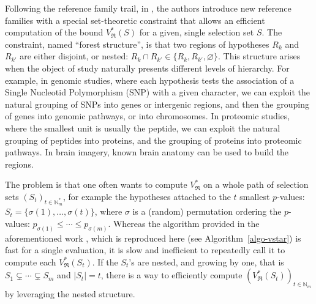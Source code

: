\documentclass[
  11pt,
  a4paper,
]{article}
\theoremstyle{plain}
\theoremstyle{definition}
\theoremstyle{plain}
\theoremstyle{definition}
\theoremstyle{plain}
\theoremstyle{remark}
\begin{document}
Following the reference family trail, in \citet{MR4178188}, the authors
introduce new reference families with a special set-theoretic constraint
that allows an efficient computation of the bound
\(V^*_{\mathfrak{R}}(S)\) for a given, single selection set \(S\). The
constraint, named ``forest structure'', is that two regions of
hypotheses \(R_k\) and \(R_{k'}\) are either disjoint, or nested:
\(R_k\cap R_{k'}\in\{R_k,R_{k'},\varnothing\}\). This structure arises
when the object of study naturally presents different levels of
hierarchy. For example, in genomic studies, where each hypothesis tests
the association of a Single Nucleotid Polymorphism (SNP) with a given
character, we can exploit the natural grouping of SNPs into genes or
intergenic regions, and then the grouping of genes into genomic
pathways, or into chromosomes. In proteomic studies, where the smallest
unit is usually the peptide, we can exploit the natural grouping of
peptides into proteins, and the grouping of proteins into proteomic
pathways. In brain imagery, known brain anatomy can be used to build the
regions.

The problem is that one often wants to compute \(V^*_{\mathfrak{R}}\) on
a whole path of selection sets \((S_t)_{t\in\mathbb{N}_m^*}\), for
example the hypotheses attached to the \(t\) smallest \(p\)-values:
\(S_t=\{\sigma(1),\dots,\sigma(t)\}\), where \(\sigma\) is a (random)
permutation ordering the \(p\)-values:
\(p_{\sigma(1)}\leq\dotsb\leq p_{\sigma(m)}\). Whereas the algorithm
provided in the aforementioned work \citep[Algorithm 1]{MR4178188},
which is reproduced here (see Algorithm~\ref{algo-vstar}) is fast for a
single evaluation, it is slow and inefficient to repeatedly call it to
compute each \(V^*_{\mathfrak{R}}(S_t)\). If the \(S_t\)'s are nested,
and growing by one, that is \(S_1\subsetneq\dotsb\subsetneq S_m\) and
\(|S_t|=t\), there is a way to efficiently compute
\(\left(V^*_{\mathfrak{R}}(S_t)\right)_{t\in\mathbb{N}_m}\) by
leveraging the nested structure.
\end{document}
